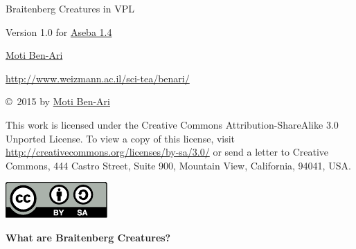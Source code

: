 \documentclass[12pt,a4paper,english]{report}
\begin{document}
\thispagestyle{empty}

\begin{center}
\begin{Huge}
\begin{bfseries}
Braitenberg Creatures in VPL
\end{bfseries}
\end{Huge}

\bigskip
\bigskip

\begin{Large}
Version 1.0
for \href{https://aseba.wikidot.com/en:downloadinstall}{Aseba 1.4}
\end{Large}


\bigskip
\bigskip
\bigskip
\bigskip
\bigskip

\begin{LARGE}
\href{http://www.weizmann.ac.il/sci-tea/benari/}{Moti Ben-Ari}
\end{LARGE}

\begin{Large}
\href{http://www.weizmann.ac.il/sci-tea/benari/}{http://www.weizmann.ac.il/sci-tea/benari/}
\end{Large}

\end{center}

\vfill

\begin{center}
\copyright{}\  2015 by \href{http://www.weizmann.ac.il/sci-tea/benari/}{Moti Ben-Ari}%
\end{center}

This work is licensed under the Creative Commons
Attribution-ShareAlike 3.0 Unported License. To view a copy
of this license, visit
\url{http://creativecommons.org/licenses/by-sa/3.0/}
or send a letter to Creative Commons, 444 Castro Street, Suite 900,
Mountain View, California, 94041, USA.

\begin{center}
\includegraphics[width=.2\textwidth]{by-sa}
\end{center}

\newpage
\thispagestyle{empty}
\setcounter{page}{1}


\begin{center}
\Large \textbf{What are Braitenberg Creatures?}
\end{center}
\end{document}
